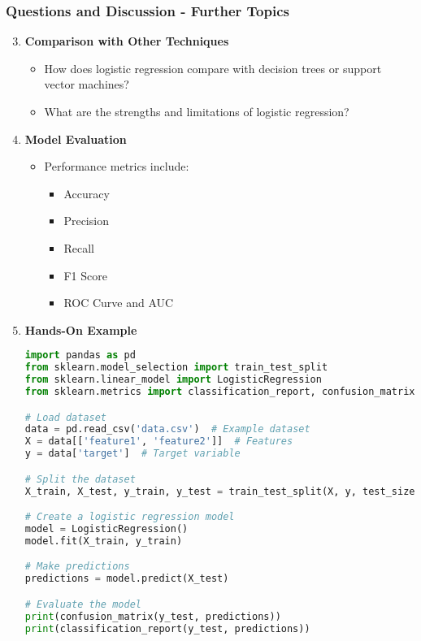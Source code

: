\documentclass[aspectratio=169]{beamer}
\begin{document}
\begin{frame}[fragile]
  \frametitle{Questions and Discussion - Further Topics}
  \begin{enumerate}
    \setcounter{enumi}{2}
    \item \textbf{Comparison with Other Techniques}
      \begin{itemize}
        \item How does logistic regression compare with decision trees or support vector machines?
        \item What are the strengths and limitations of logistic regression?
      \end{itemize}
    \item \textbf{Model Evaluation}
      \begin{itemize}
        \item Performance metrics include:
          \begin{itemize}
            \item Accuracy
            \item Precision
            \item Recall
            \item F1 Score
            \item ROC Curve and AUC
          \end{itemize}
      \end{itemize}
    \item \textbf{Hands-On Example}
      \begin{lstlisting}[language=Python]
import pandas as pd
from sklearn.model_selection import train_test_split
from sklearn.linear_model import LogisticRegression
from sklearn.metrics import classification_report, confusion_matrix

# Load dataset
data = pd.read_csv('data.csv')  # Example dataset
X = data[['feature1', 'feature2']]  # Features
y = data['target']  # Target variable

# Split the dataset
X_train, X_test, y_train, y_test = train_test_split(X, y, test_size=0.2, random_state=42)

# Create a logistic regression model
model = LogisticRegression()
model.fit(X_train, y_train)

# Make predictions
predictions = model.predict(X_test)

# Evaluate the model
print(confusion_matrix(y_test, predictions))
print(classification_report(y_test, predictions))
      \end{lstlisting}
    \end{enumerate}
\end{frame}
\end{document}
